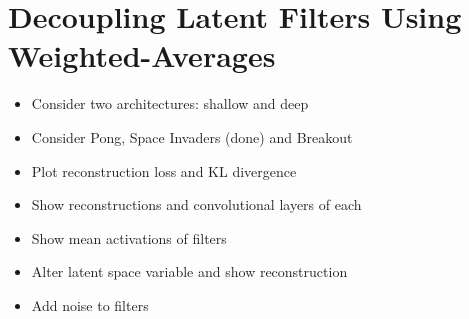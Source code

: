 %
%
%
%
%
\section{Decoupling Latent Filters Using Weighted-Averages}
\begin{itemize}
\item Consider two architectures: shallow and deep
\item Consider Pong, Space Invaders (done) and Breakout
\item Plot reconstruction loss and KL divergence
\item Show reconstructions and convolutional layers of each
\item Show mean activations of filters
\item Alter latent space variable and show reconstruction
\item Add noise to filters
\end{itemize}




